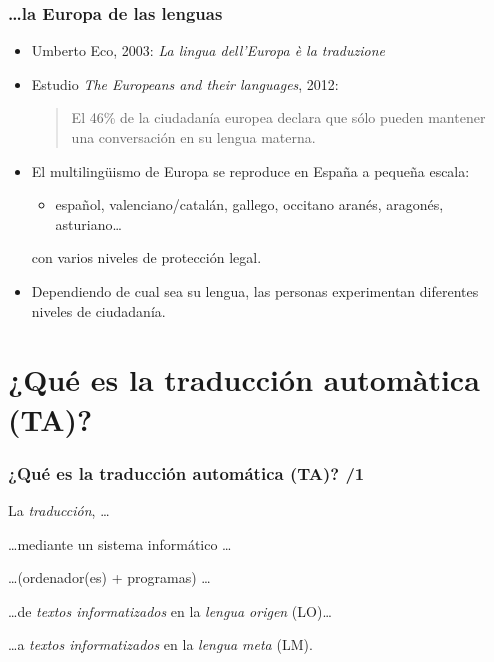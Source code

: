 \documentclass{beamer}
\newcommand{\empha}[1]{\emph{#1}}
\begin{document}
\begin{frame}
\frametitle{\ldots la Europa de las lenguas}
\begin{itemize}
\item Umberto Eco, 2003: \emph{La lingua dell'Europa è la traduzione}
\item Estudio \emph{The Europeans and their languages}, 2012:
\begin{quote}
El 46\% de la ciudadanía europea declara que sólo pueden mantener una conversación en su lengua materna.
\end{quote}
\item El multilingüismo de Europa se reproduce en España a pequeña escala:
\begin{itemize}
\item español, valenciano/catalán, gallego, occitano aranés, aragonés, asturiano\ldots
\end{itemize}
con varios niveles de protección legal.
\item Dependiendo de cual sea su lengua, las personas experimentan diferentes niveles de ciudadanía.
\end{itemize}

\end{frame}





\section{¿Qué es la traducción automàtica (TA)?}
\begin{frame}
\frametitle{¿Qué es la traducción automática (TA)? /1}

{
{La \empha{traducción}, \ldots }
\pause

{\ldots mediante un sistema informático \ldots}
\pause

{\ldots (ordenador(es) +
  programas) \ldots}
\pause

{\ldots de \empha{textos informatizados} en la \empha{lengua
    origen} (LO)\ldots}
\pause

{\ldots a \empha{textos informatizados} en la \empha{lengua meta}
  (LM).}

}
\end{frame}
\end{document}
